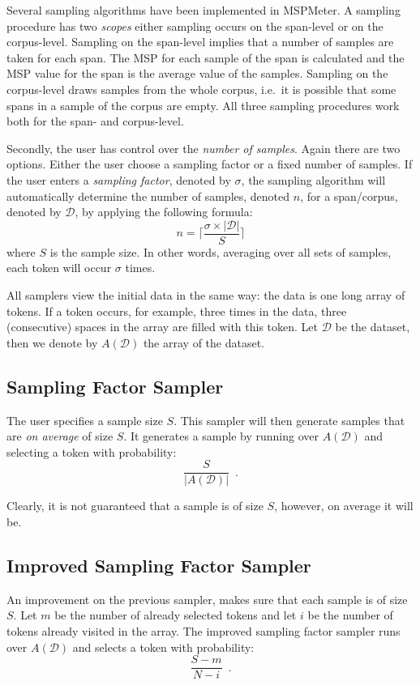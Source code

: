 \documentclass{article}
\begin{document}
Several sampling algorithms have been implemented in MSPMeter. A sampling procedure has two \emph{scopes} either sampling occurs on the span-level or on the corpus-level. Sampling on the span-level implies that a number of samples are taken for each span. The MSP for each sample of the span is calculated and the MSP value for the span is the average value of the samples. Sampling on the corpus-level draws samples from the whole corpus, i.e.\ it is possible that some spans in a sample of the corpus are empty. All three sampling procedures work both for the span- and corpus-level. 

Secondly, the user has control over the \emph{number of samples}. Again there are two options. Either the user choose a sampling factor or a fixed number of samples. If the user enters a \emph{sampling factor}, denoted by $\sigma$, the sampling algorithm will automatically determine the number of samples, denoted $n$, for a span/corpus, denoted by $\mathcal{D}$, by applying the following formula: 
$$n = \lceil \frac{\sigma \times |\mathcal{D}|}{S} \rceil$$
where $S$ is the sample size. In other words, averaging over all sets of samples, each token will occur $\sigma$ times. 

All samplers view the initial data in the same way: the data is one long array of tokens. If a token occurs, for example, three times in the data, three (consecutive) spaces in the array are filled with this token. Let $\mathcal{D}$ be the dataset, then we denote by $A(\mathcal{D})$ the array of the dataset.

\subsection{Sampling Factor Sampler}

The user specifies a sample size $S$. This sampler will then generate samples that are \emph{on average} of size $S$. It generates a sample by running over $A(\mathcal{D})$ and selecting a token with probability:
$$\frac{S}{|A(\mathcal{D})|} \enspace.$$

Clearly, it is not guaranteed that a sample is of size $S$, however, on average it will be.



\subsection{Improved Sampling Factor Sampler}

An improvement on the previous sampler, makes sure that each sample is of size $S$. Let $m$ be the number of already selected tokens and let $i$ be the number of tokens already visited in the array. The improved sampling factor sampler runs over $A(\mathcal{D})$ and selects a token with probability:
$$\frac{S-m}{N-i} \enspace.$$ 
\end{document}
